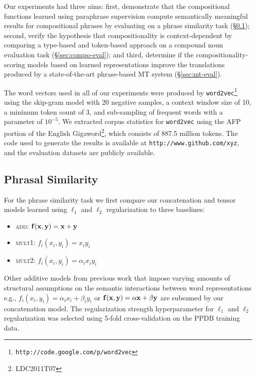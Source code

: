 \documentclass[11pt]{article}
\newcommand{\bX}{{\bf x}}
\newcommand{\bY}{{\bf y}}
\newcommand{\bF}{{\bf f}}
\begin{document}
Our experiments had three aims: first, demonstrate that the compositional functions learned using paraphrase supervision compute semantically meaningful results for compositional phrases by evaluating on a phrase similarity task (\S\ref{sec:phrasesim-eval}); second, verify the hypothesis that compositionality is context-dependent by comparing a type-based and token-based approach on a compound noun evaluation task (\S\ref{sec:compo-eval}); and third, determine if the compositionality-scoring models based on learned representations improve the translations produced by a state-of-the-art phrase-based MT system (\S\ref{sec:mt-eval}).  

The word vectors used in all of our experiments were produced by \texttt{word2vec}\footnote{\texttt{http://code.google.com/p/word2vec}} using the skip-gram model with 20 negative samples, a context window size of 10, a minimum token count of 3, and sub-sampling of frequent words with a parameter of $10^{-5}$.  
We extracted corpus statistics for \texttt{word2vec} using the AFP portion of the English Gigaword\footnote{LDC2011T07}, which consists of 887.5 million tokens. 
The code used to generate the results is available at \texttt{http://www.github.com/xyz}, and the evaluation datasets are publicly available. 

\subsection{Phrasal Similarity}
\label{sec:phrasesim-eval}

For the phrase similarity task we first compare our concatenation and tensor models learned using $\ell_1$ and $\ell_2$ regularization to three baselines:
\begin{itemize}[noitemsep]
	\item \textsc{add}: $\bF(\bX, \bY) = \bX + \bY$
	\item \textsc{mult1}: $f_i(x_i, y_i) = x_i y_i$
	\item \textsc{mult2}: $f_i(x_i, y_i) = \alpha_i x_i y_i$
\end{itemize}
Other additive models from previous work \cite{Mitchell2010,Zanzotto2010,Blacoe2012} that impose varying amounts of structural assumptions on the semantic interactions between word representations e.g., $f_i(x_i, y_i) = \alpha_i x_i + \beta_i y_i$ or $\bF(\bX, \bY) = \alpha\bX + \beta\bY$ are subsumed by our concatenation model. 
The regularization strength hyperparameter for $\ell_1$ and $\ell_2$ regularization was selected using 5-fold cross-validation on the PPDB training data. 
\end{document}
